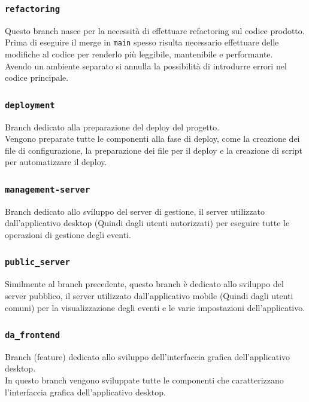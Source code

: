 \documentclass{article}
\begin{document}
\subsubsection{\texttt{refactoring}}

Questo branch nasce per la necessità di effettuare refactoring sul codice prodotto. Prima di eseguire il merge in \texttt{main} spesso risulta necessario effettuare delle modifiche al codice per renderlo più leggibile, mantenibile e performante.\\
Avendo un ambiente separato si annulla la possibilità di introdurre errori nel codice principale.

\subsubsection{\texttt{deployment}}

Branch dedicato alla preparazione del deploy del progetto.\\
Vengono preparate tutte le componenti alla fase di deploy, come la creazione dei file di configurazione, la preparazione dei file per il deploy e la creazione di script per automatizzare il deploy.

\subsubsection{\texttt{management-server}}

Branch dedicato allo sviluppo del server di gestione, il server utilizzato dall'applicativo desktop (Quindi dagli utenti autorizzati) per eseguire tutte le operazioni di gestione degli eventi.

\subsubsection{\texttt{public\_server}}

Similmente al branch precedente, questo branch è dedicato allo sviluppo del server pubblico, il server utilizzato dall'applicativo mobile (Quindi dagli utenti comuni) per la visualizzazione degli eventi e le varie impostazioni dell'applicativo.

\subsubsection{\texttt{da\_frontend}}

Branch (feature) dedicato allo sviluppo dell'interfaccia grafica dell'applicativo desktop.\\
In questo branch vengono sviluppate tutte le componenti che caratterizzano l'interfaccia grafica dell'applicativo desktop.
\end{document}
